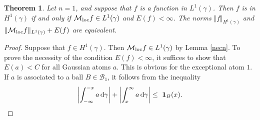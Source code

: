 \documentclass{amsart}                 %
\newtheorem{theorem}{Theorem}[section]
\numberwithin{equation}{section}
\renewcommand\mod[1]{\left\vert{#1}\right\vert}
\newcommand\norm[2]{{\Vert{#1}\Vert_{#2}}}
\newcommand\wrt{\,\mathrm{d}}
\newcommand\1{{\bf 1}}
\newcommand\cB{\mathcal{B}}  \newcommand\fB{\mathfrak{B}}
\newcommand\cM{\mathcal{M}}  \newcommand\fM{\mathfrak{M}}
\newcommand\mlo {\cM_{\textnormal{loc}}}
\newcommand\huat[1]{H^1(#1)}
\begin{document}
\begin{theorem}\label{char} Let $n=1$, and 
suppose that $f$ is a function in $L^1(\gamma)$. Then $f$ is in
$H^1(\gamma)$ if and only if $\mlo f\in L^1(\gamma)$ 
and $E(f)<\infty$. The norms $\norm{f}{H^1(\gamma)}$ and 
$\norm{\mlo{f}}{L^1(\gamma)}+E(f)$ are equivalent.
\end{theorem}
\begin{proof}
Suppose that $f\in\huat{\gamma}$. Then $\mlo f\in  L^1(\gamma)$ by 
Lemma \ref{necn}. To prove the necessity of the condition $E(f)<\infty$,
it suffices to show that  $E(a)<C$ 
for all Gaussian atoms $a$. This is obvious for the exceptional atom $1$.
If $a$ is associated to a ball $B \in \cB_1$, it follows from the 
inequality
$$
\mod{\int_{-\infty}^{-x} a\wrt\gamma}+\mod{\int_{x}^{\infty} a\wrt
\gamma}\le \ \1_B(x).
$$


\end{proof}
\end{document}
